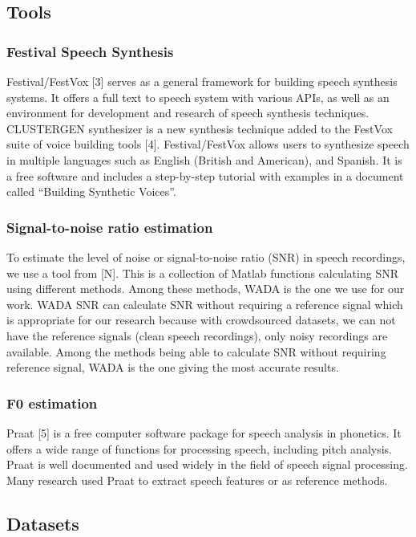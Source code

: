 \documentclass[12pt]{article}
\begin{document}
\subsection{Tools}

\subsubsection{Festival Speech Synthesis}
Festival/FestVox [3] serves as a general framework for building speech synthesis systems. It offers a full text to speech system with various APIs, as well as an environment for development and research of speech synthesis techniques. CLUSTERGEN synthesizer is a new synthesis technique added to the FestVox suite of voice building tools [4]. Festival/FestVox allows users to synthesize speech in multiple languages such as English (British and American), and Spanish. It is a free software and includes a step-by-step tutorial with examples in a document called “Building Synthetic Voices”.

\subsubsection{Signal-to-noise ratio estimation}
To estimate the level of noise or signal-to-noise ratio (SNR) in speech recordings, we use a tool from [N]. This is a collection of Matlab functions calculating SNR using different methods. Among these methods, WADA is the one we use for our work. WADA SNR can calculate SNR without requiring a reference signal which is appropriate for our research because with crowdsourced datasets, we can not have the reference signals (clean speech recordings), only noisy recordings are available. Among the methods being able to calculate SNR without requiring reference signal, WADA is the one giving the most accurate results.

\subsubsection{F0 estimation}
Praat [5] is a free computer software package for speech analysis in phonetics. It offers a wide range of functions for processing speech, including pitch analysis. Praat is well documented and used widely in the field of speech signal processing. Many research used Praat to extract speech features or as reference methods.

\subsection{Datasets}
\end{document}

